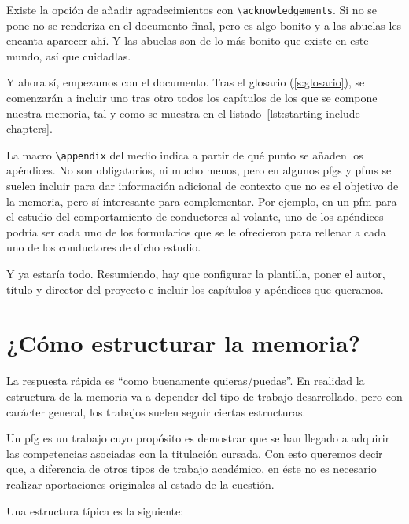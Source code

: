 Existe la opción de añadir agradecimientos con \lstinline{\acknowledgements}. Si no se pone no se renderiza en el documento final, pero es algo bonito y a las abuelas les encanta aparecer ahí. Y las abuelas son de lo más bonito que existe en este mundo, así que cuidadlas.

Y ahora sí, empezamos con el documento. Tras el glosario (\autoref{s:glosario}), se comenzarán a incluir uno tras otro todos los capítulos de los que se compone nuestra memoria, tal y como se muestra en el listado~\ref{lst:starting-include-chapters}.



La macro \lstinline{\appendix} del medio indica a partir de qué punto se añaden los apéndices. No son obligatorios, ni mucho menos, pero en algunos \glspl{pfg} y \glspl{pfm} se suelen incluir para dar información adicional de contexto que no es el objetivo de la memoria, pero sí interesante para complementar. Por ejemplo, en un \gls{pfm} para el estudio del comportamiento de conductores al volante, uno de los apéndices podría ser cada uno de los formularios que se le ofrecieron para rellenar a cada uno de los conductores de dicho estudio.

Y ya estaría todo. Resumiendo, hay que configurar la plantilla, poner el autor, título y director del proyecto e incluir los capítulos y apéndices que queramos.

\section{¿Cómo estructurar la memoria?}
\label{s:como-estructurar}

La respuesta rápida es \enquote{como buenamente quieras/puedas}. En realidad la estructura de la memoria va a depender del tipo de trabajo desarrollado, pero con carácter general, los trabajos suelen seguir ciertas estructuras.

Un \gls{pfg} es un trabajo cuyo propósito es demostrar que se han llegado a adquirir las competencias asociadas con la titulación cursada. Con esto queremos decir que, a diferencia de otros tipos de trabajo académico, en éste no es necesario realizar aportaciones originales al estado de la cuestión.

Una estructura típica es la siguiente:

